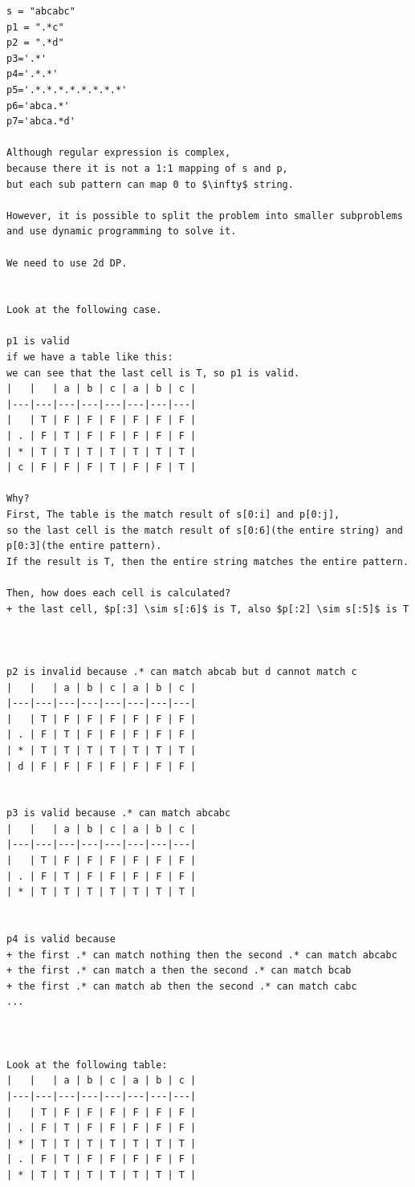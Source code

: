 \documentclass[
  letterpaper,
  DIV=11,
  numbers=noendperiod]{scrartcl}
\begin{document}
\begin{verbatim}
s = "abcabc"
p1 = ".*c"
p2 = ".*d"
p3='.*'
p4='.*.*'
p5='.*.*.*.*.*.*.*.*'
p6='abca.*'
p7='abca.*d'

Although regular expression is complex,
because there it is not a 1:1 mapping of s and p,
but each sub pattern can map 0 to $\infty$ string.

However, it is possible to split the problem into smaller subproblems and use dynamic programming to solve it.

We need to use 2d DP.


Look at the following case.

p1 is valid
if we have a table like this:
we can see that the last cell is T, so p1 is valid.
|   |   | a | b | c | a | b | c |
|---|---|---|---|---|---|---|---|
|   | T | F | F | F | F | F | F |
| . | F | T | F | F | F | F | F |
| * | T | T | T | T | T | T | T |
| c | F | F | F | T | F | F | T |

Why?
First, The table is the match result of s[0:i] and p[0:j],
so the last cell is the match result of s[0:6](the entire string) and p[0:3](the entire pattern).
If the result is T, then the entire string matches the entire pattern.

Then, how does each cell is calculated?
+ the last cell, $p[:3] \sim s[:6]$ is T, also $p[:2] \sim s[:5]$ is T



p2 is invalid because .* can match abcab but d cannot match c
|   |   | a | b | c | a | b | c |
|---|---|---|---|---|---|---|---|
|   | T | F | F | F | F | F | F |
| . | F | T | F | F | F | F | F |
| * | T | T | T | T | T | T | T |
| d | F | F | F | F | F | F | F |


p3 is valid because .* can match abcabc
|   |   | a | b | c | a | b | c |
|---|---|---|---|---|---|---|---|
|   | T | F | F | F | F | F | F |
| . | F | T | F | F | F | F | F |
| * | T | T | T | T | T | T | T |


p4 is valid because 
+ the first .* can match nothing then the second .* can match abcabc
+ the first .* can match a then the second .* can match bcab
+ the first .* can match ab then the second .* can match cabc
...



Look at the following table:
|   |   | a | b | c | a | b | c |
|---|---|---|---|---|---|---|---|
|   | T | F | F | F | F | F | F |
| . | F | T | F | F | F | F | F |
| * | T | T | T | T | T | T | T |
| . | F | T | F | F | F | F | F |
| * | T | T | T | T | T | T | T |



\end{verbatim}
\end{document}
